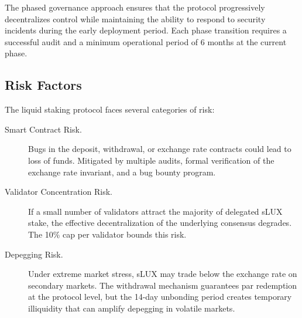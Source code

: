 \documentclass[11pt,a4paper]{article}
\begin{document}
The phased governance approach ensures that the protocol progressively decentralizes control while maintaining the ability to respond to security incidents during the early deployment period. Each phase transition requires a successful audit and a minimum operational period of 6 months at the current phase.

\subsection{Risk Factors}

The liquid staking protocol faces several categories of risk:

\begin{description}
    \item[Smart Contract Risk.] Bugs in the deposit, withdrawal, or exchange rate contracts could lead to loss of funds. Mitigated by multiple audits, formal verification of the exchange rate invariant, and a bug bounty program.
    \item[Validator Concentration Risk.] If a small number of validators attract the majority of delegated sLUX stake, the effective decentralization of the underlying consensus degrades. The 10\% cap per validator bounds this risk.
    \item[Depegging Risk.] Under extreme market stress, sLUX may trade below the exchange rate on secondary markets. The withdrawal mechanism guarantees par redemption at the protocol level, but the 14-day unbonding period creates temporary illiquidity that can amplify depegging in volatile markets.
\end{description}
\end{document}
